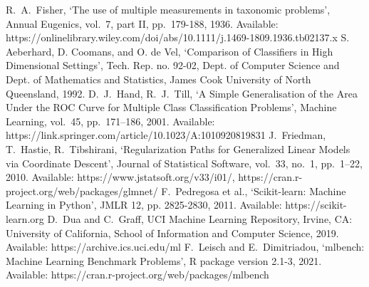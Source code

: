 \clearpage
{}
\begin{thebibliography}{99}
R.\ A.\ Fisher, `The use of multiple measurements in taxonomic problems', Annual Eugenics, vol.\ 7, part II, pp.\ 179-188, 1936. Available: https://onlinelibrary.wiley.com/doi/abs/10.1111/j.1469-1809.1936.tb02137.x
%
S. Aeberhard, D. Coomans, and O. de Vel, `Comparison of Classifiers in High Dimensional Settings', Tech. Rep. no. 92-02, Dept. of Computer Science and Dept. of Mathematics and Statistics, James Cook University of North Queensland, 1992. 
%
D.\ J.\ Hand, R.\ J.\ Till, `A Simple Generalisation of the Area Under the ROC Curve for Multiple Class Classification Problems', Machine Learning, vol.\ 45, pp.\ 171--186, 2001. Available: https://link.springer.com/article/10.1023/A:1010920819831
%
J.\ Friedman, T.\ Hastie, R.\ Tibshirani, `Regularization Paths for Generalized Linear Models via Coordinate Descent', Journal of Statistical Software, vol.\ 33, no.\ 1, pp.\ 1--22, 2010. Available: https://www.jstatsoft.org/v33/i01/, https://cran.r-project.org/web/packages/glmnet/
%
F.\ Pedregosa et al., `Scikit-learn: Machine Learning in Python', JMLR 12, pp. 2825-2830, 2011. Available: https://scikit-learn.org
%
D.\ Dua and C.\ Graff, UCI Machine Learning Repository, Irvine, CA: University of California, School of Information and Computer Science, 2019. Available: https://archive.ics.uci.edu/ml
%
F.\ Leisch and E.\ Dimitriadou, `mlbench: Machine Learning Benchmark Problems', R package version 2.1-3, 2021. Available: https://cran.r-project.org/web/packages/mlbench
\end{thebibliography}
\endinput
